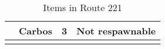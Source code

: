 \begin{longtable}{|| l l l l ||}%
\hline%
&Carbos&3&Not respawnable\\%
\hline%
\endhead%
\hline%
\caption{Items in Route 221}%
\label{tab:Route221Items}%
\end{longtable}